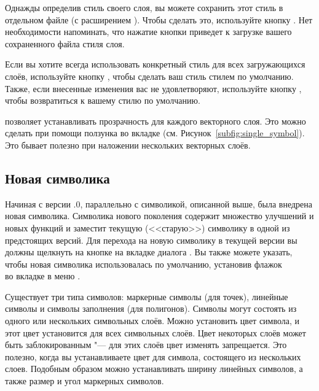 Однажды определив стиль своего слоя, вы можете сохранить этот стиль в
отдельном файле (с расширением ). Чтобы сделать это,
используйте кнопку . Нет необходимости
напоминать, что нажатие кнопки  приведет к
загрузке вашего сохраненного файла стиля слоя.

Если вы хотите всегда использовать конкретный стиль для всех загружающихся
слоёв, используйте кнопку ,
чтобы сделать ваш стиль стилем по умолчанию. Также, если внесенные изменения
вас не удовлетворяют, используйте кнопку ,
чтобы возвратиться к вашему стилю по умолчанию.

 \label{sec:vect_transparency}

\qg позволяет устанавливать прозрачность для каждого векторного слоя. Это
можно сделать при помощи ползунка  во вкладке 
(см. Рисунок~\ref{subfig:single_symbol}). Это бывает полезно при наложении
нескольких векторных слоёв.

\subsection{Новая символика}

Начиная с версии .0, параллельно с символикой, описанной выше, была
внедрена новая символика. Символика нового поколения содержит множество
улучшений и новых функций и заместит текущую (<<старую>>) символику в одной из
предстоящих версий. Для перехода на новую символику в текущей версии вы
должны щелкнуть на кнопке  на вкладке 
диалога . Вы также можете указать, чтобы новая символика
использовалась по умолчанию, установив флажок \\
 во вкладке
 в меню  \arrow {}.


Существует три типа символов: маркерные символы (для точек), линейные символы
и символы заполнения (для полигонов). Символы могут состоять из одного или
нескольких символьных слоёв. Можно установить цвет символа, и этот цвет
установится для всех символьных слоёв. Цвет некоторых слоёв может быть
заблокированным "--- для этих слоёв цвет изменять запрещается. Это полезно,
когда вы устанавливаете цвет для символа, состоящего из нескольких слоев.
Подобным образом можно устанавливать ширину линейных символов, а также
размер и угол маркерных символов.

